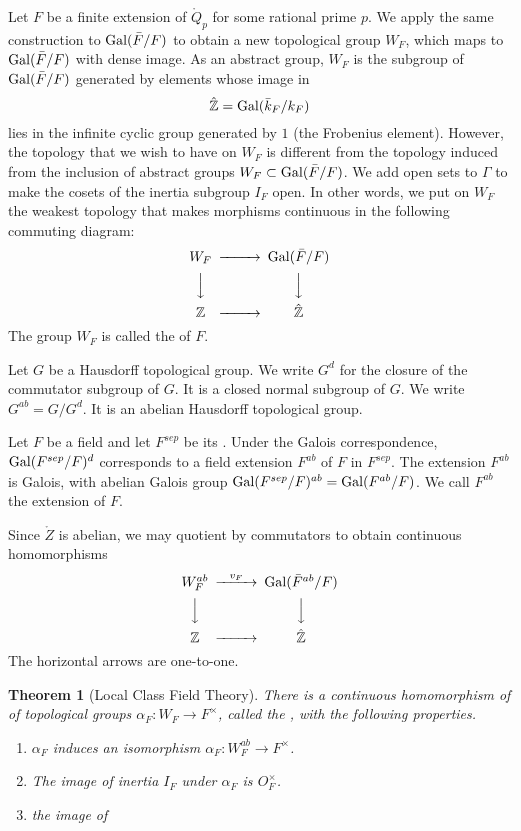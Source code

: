 \documentclass{amsart}
\newtheorem{theorem}[equation]{Theorem}
\begin{document}
Let $F$ be a finite extension of $\ring{Q}_p$ for some rational prime $p$.
We apply the same construction to ${\operatorname{Gal}}(\bar F/F)$ to obtain a 
new topological group $W_F$, which maps to ${\operatorname{Gal}}(\bar F/F)$ with dense
image.  As an abstract group, $W_F$ is the subgroup of ${\operatorname{Gal}}(\bar F/F)$
generated by elements whose image in
\[
\hat{\mathbb{Z}} = {\operatorname{Gal}}(\bar k_F/k_F)
\]
lies in the infinite cyclic group generated by $1$ (the Frobenius element).
However, the topology that we wish to have on $W_F$ is different from the
topology induced from the inclusion of abstract groups $W_F\subset {\operatorname{Gal}}(\bar F/F)$.
We add open sets to $\Gamma$ to make the cosets of the inertia subgroup $I_F$
open.  In other words, we put on $W_F$ the weakest topology that makes 
morphisms continuous in the following commuting diagram:
\[
\begin{CD}
W_F @>>> \op{Gal}(\bar F/F)\\
@VVV @VVV\\
\ring{Z} @>>> \hat{\ring{Z}}\\
\end{CD}
\]
The group $W_F$ is called the  of $F$.



Let $G$ be a Hausdorff topological group.  We write $G^d$ for the closure of
the commutator subgroup of $G$.  It is a closed normal subgroup of $G$.
We write $G^{ab} = G/G^d$.  It is an abelian Hausdorff topological group.

Let $F$ be a field and let $F^{sep}$ be its .
Under the Galois correspondence, ${\operatorname{Gal}}(F^{sep}/F)^d$ corresponds to
a field extension $F^{ab}$ of $F$ in $F^{sep}$.  The extension $F^{ab}$ is
Galois, with abelian Galois group ${\operatorname{Gal}}(F^{sep}/F)^{ab} = {\operatorname{Gal}}(F^{ab}/F)$.
We call $F^{ab}$ the  extension of $F$.

Since $\ring{Z}$ is abelian, we may quotient by commutators to obtain
continuous homomorphisms
\[
\begin{CD}
W^{ab}_F @>v_F>> \op{Gal}(\bar F^{ab}/F)\\
@VVV @VVV\\
\ring{Z} @>>> \hat{\ring{Z}}\\
\end{CD}
\]
The horizontal arrows are one-to-one.

\begin{theorem}[Local Class Field Theory]  There is a continuous homomorphism of
of topological groups $\alpha_F:W_F\to F^\times$, called the , with the following properties.
\begin{enumerate}
\item $\alpha_F$ induces an isomorphism $\alpha_F:W^{ab}_F \to F^\times$.
\item The image of inertia $I_F$ under $\alpha_F$ is $O_F^\times$.
\item the image of 
\end{enumerate}
\end{theorem}
\end{document}
